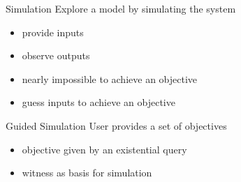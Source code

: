\begin{frame}{Simulation}
  Explore a model by simulating the system
  \begin{itemize}
    \item provide inputs 
    \item observe outputs
  \end{itemize}

  \vfill

  \begin{itemize}
    \item nearly impossible to achieve an objective
    \item guess inputs to achieve an objective
  \end{itemize}
\end{frame}

\begin{frame}{Guided Simulation}
  User provides a set of objectives
  \begin{itemize}
    \item objective given by an existential query
    \item witness as basis for simulation
  \end{itemize}
\end{frame}

